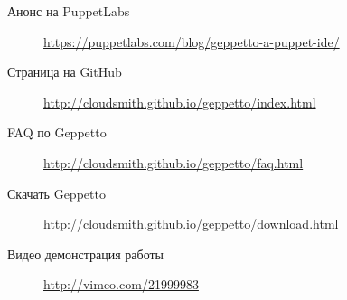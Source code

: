 \begin{description}
\item[Анонс на PuppetLabs] \url{https://puppetlabs.com/blog/geppetto-a-puppet-ide/}
\item[Страница на GitHub] \url{http://cloudsmith.github.io/geppetto/index.html}
\item[FAQ по Geppetto] \url{http://cloudsmith.github.io/geppetto/faq.html}
\item[Скачать Geppetto] \url{http://cloudsmith.github.io/geppetto/download.html}
\item[Видео демонстрация работы] \url{http://vimeo.com/21999983}
\end{description}
